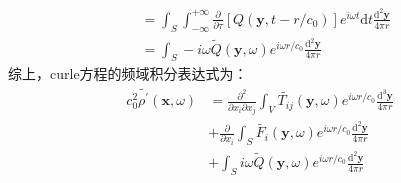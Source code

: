 \begin{enumerate}
\begin{equation}
\begin{aligned}
                &= \int_{S} \int_{-\infty}^{+\infty} \frac{\partial}{\partial \tau} \left[Q\left(\mathbf{y}, t-r / c_{0}\right)\right] e^{i \omega t}\mathrm{d} t \frac{\mathrm{d}^{2} \mathbf{y}}{4 \pi r} \\
                &= \int_{S} - i \omega \widetilde{Q}(\mathbf{y}, \omega) e^{i \omega r / c_{0}} \frac{\mathrm{d}^{2} \mathbf{y}}{4 \pi r}
            \end{aligned}
        \end{equation}
        综上，curle方程的频域积分表达式为：
        \begin{equation}
            \begin{aligned}
                c_{0}^{2} \tilde{\rho^{\prime}}(\mathbf{x}, \omega)
                &= \frac{\partial^{2}}{\partial x_{i} \partial x_{j}} \int_{V} \widetilde{T_{i j}}(\mathbf{y}, \omega) e^{i \omega r / c_{0}} \frac{\mathrm{d}^{3} \mathbf{y}}{4 \pi r} \\
                &+ \frac{\partial}{\partial x_{i}} \int_{S} \widetilde{F_{i}}(\mathbf{y}, \omega) e^{i \omega r / c_{0}} \frac{\mathrm{d}^{2} \mathbf{y}}{4 \pi r} \\
                &+ \int_{S} i \omega \widetilde{Q}(\mathbf{y}, \omega) e^{i \omega r / c_{0}} \frac{\mathrm{d}^{2} \mathbf{y}}{4 \pi r}
            \end{aligned}
        \end{equation}
\end{enumerate}